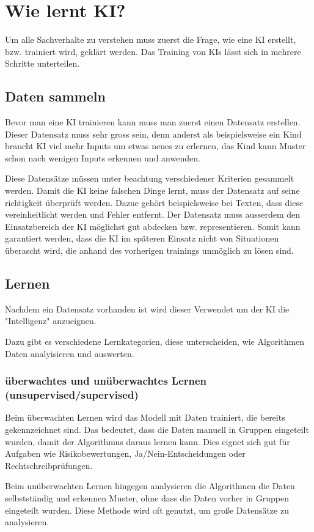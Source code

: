 \chapter{Wie lernt KI?}
\label{chap:ai-training}

Um alle Sachverhalte zu verstehen muss zuerst die Frage, wie eine KI erstellt, bzw. trainiert wird, geklärt werden.
Das Training von KIs lässt sich in mehrere Schritte unterteilen.

\section{Daten sammeln}
Bevor man eine KI trainieren kann muss man zuerst einen Datensatz erstellen. Dieser Datensatz muss sehr gross sein, denn anderst als beispielsweise ein Kind braucht KI viel mehr Inputs um etwas neues zu erlernen, das Kind kann Muster schon nach wenigen Inputs erkennen und anwenden.

Diese Datensätze müssen unter beachtung verschiedener Kriterien gesammelt werden. 
Damit die KI keine falschen Dinge lernt, muss der Datensatz auf seine richtigkeit überprüft werden. Dazue gehört beispielsweise bei Texten, dass diese vereinheitlicht werden und Fehler entfernt.
Der Datensatz muss ausserdem den Einsatzbereich der KI möglichst gut abdecken bzw. representieren. Somit kann garantiert werden, dass die KI im späteren Einsatz nicht von Situationen überascht wird, die anhand des vorherigen trainings unmöglich zu lösen sind.

\section{Lernen}
Nachdem ein Datensatz vorhanden ist wird dieser Verwendet um der KI die "Intelligenz" anzueignen. 

Dazu gibt es verschiedene Lernkategorien, diese unterscheiden, wie Algorithmen Daten analyisieren und auswerten.
\subsection{überwachtes und unüberwachtes Lernen (unsupervised/supervised)}
Beim überwachten Lernen wird das Modell mit Daten trainiert, die bereits gekennzeichnet sind. Das bedeutet, dass die Daten manuell in Gruppen eingeteilt wurden, damit der Algorithmus daraus lernen kann. 
Dies eignet sich gut für Aufgaben wie Risikobewertungen, Ja/Nein-Entscheidungen oder Rechtschreibprüfungen.

Beim unüberwachten Lernen hingegen analysieren die Algorithmen die Daten selbstständig und erkennen Muster, ohne dass die Daten vorher in Gruppen eingeteilt wurden. 
Diese Methode wird oft genutzt, um große Datensätze zu analysieren.

